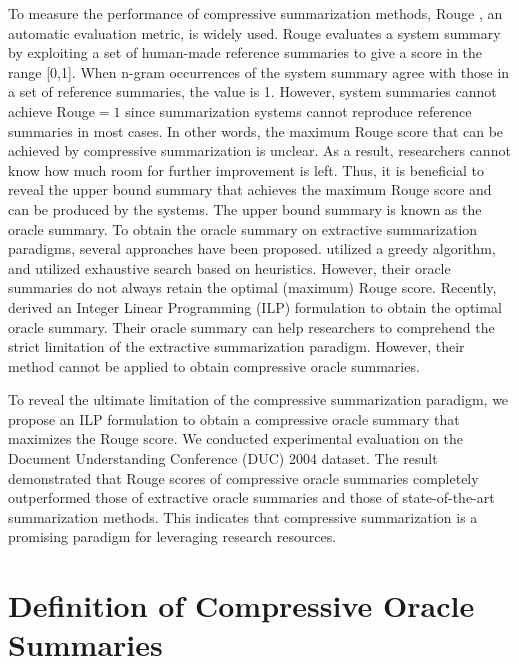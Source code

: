\documentclass[11pt,a4paper]{article}
\begin{document}
To measure the performance of compressive summarization methods,
{\sc Rouge} \citep{rouge}, an automatic evaluation metric, is widely
used. {\sc Rouge} evaluates a system summary by exploiting a set of
human-made reference summaries to give a score in the range [0,1]. When
n-gram occurrences of the system summary agree with those in a set of
reference summaries, the value is 1. However, system summaries cannot
achieve {\sc Rouge}${=}1$ since summarization systems cannot reproduce
reference summaries in most cases. In other words, the maximum {\sc Rouge}
score that can be achieved by compressive summarization is unclear. As a
result, researchers cannot know how much room for further improvement is left.
Thus, it is beneficial to reveal the upper bound summary that achieves the maximum {\sc
Rouge} score and can be produced by the systems.
The upper bound summary is known as the oracle summary.
To obtain the oracle summary on extractive summarization paradigms,
several approaches have been proposed.
\citet{sipos-shivaswamy-joachims:2012:EACL2012} utilized a greedy algorithm, and
\citet{kubina-conroy-schlesinger:2013:MultiLing} utilized exhaustive
search based on heuristics. However, their oracle summaries do not always
retain the optimal (maximum) {\sc Rouge} score.
Recently, \citet{hirao:eacl2017} derived an Integer Linear Programming (ILP)
formulation to obtain the optimal oracle summary.
Their oracle summary can help researchers to 
comprehend the strict limitation of the extractive
summarization paradigm.
However, their method cannot be applied to obtain compressive oracle
summaries.

To reveal the ultimate limitation of the compressive summarization
paradigm, we propose an ILP formulation to
obtain a compressive oracle summary that maximizes the {\sc Rouge} score.
We conducted experimental evaluation on the Document Understanding Conference
(DUC) 2004 dataset. The result
demonstrated that {\sc Rouge} scores of compressive oracle summaries completely
outperformed those of extractive oracle summaries and those
of state-of-the-art summarization methods.
This indicates that compressive summarization is a promising paradigm for leveraging research resources.


\section{Definition of Compressive Oracle Summaries}
\end{document}
